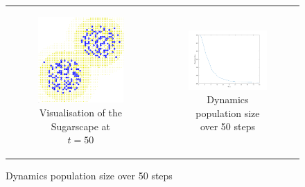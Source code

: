 \begin{figure}
\begin{center}
	\begin{tabular}{c c}
		\begin{subfigure}[b]{0.4\textwidth}
			\centering
			\includegraphics[width=1\textwidth, angle=0]{./fig/sugarscape/vis/sugarscape_t60_environment.png}
			\caption{Visualisation of the Sugarscape at $t = 50$}
			\label{fig:vis_sugarscape_t50_environment}
		\end{subfigure}
    	
    	&
  
		\begin{subfigure}[b]{0.6\textwidth}
			\centering
			\includegraphics[width=1\textwidth, angle=0]{./fig/sugarscape/vis/sugarscape_t60_dynamics.png}
			\caption{Dynamics population size over 50 steps}
			\label{fig:vis_sugarscape_t50_dynamics}
		\end{subfigure}
	\end{tabular}
	

\end{center}
\end{figure}
